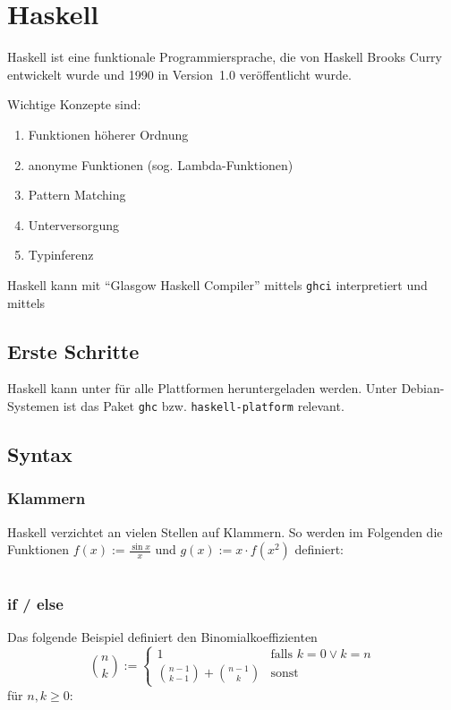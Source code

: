 \chapter{Haskell}
Haskell ist eine funktionale Programmiersprache, die von Haskell 
Brooks Curry entwickelt wurde und 1990 in Version~1.0 veröffentlicht 
wurde.

Wichtige Konzepte sind:
\begin{enumerate}
    \item Funktionen höherer Ordnung
    \item anonyme Funktionen (sog. Lambda-Funktionen)
    \item Pattern Matching
    \item Unterversorgung
    \item Typinferenz
\end{enumerate}

Haskell kann mit \enquote{Glasgow Haskell Compiler} mittels 
\texttt{ghci} interpretiert und mittels 

\section{Erste Schritte}
Haskell kann unter \href{http://www.haskell.org/platform/}{}
für alle Plattformen heruntergeladen werden. Unter Debian-Systemen
ist das Paket \texttt{ghc} bzw. \texttt{haskell-platform} relevant.

\section{Syntax}
\subsection{Klammern}
Haskell verzichtet an vielen Stellen auf Klammern. So werden im
Folgenden die Funktionen $f(x) := \frac{\sin x}{x}$ und $g(x) := x \cdot f(x^2)$
definiert:

\inputminted[numbersep=5pt, tabsize=4]{haskell}{scripts/haskell/einfaches-beispiel-klammern.hs}

\subsection{if / else}
Das folgende Beispiel definiert den Binomialkoeffizienten 
\[\binom{n}{k} := \begin{cases}
        1                               &\text{falls } k=0 \lor k = n\\
        \binom{n-1}{k-1}+\binom{n-1}{k} &\text{sonst}
        \end{cases}\]
für $n,k \geq 0$:

